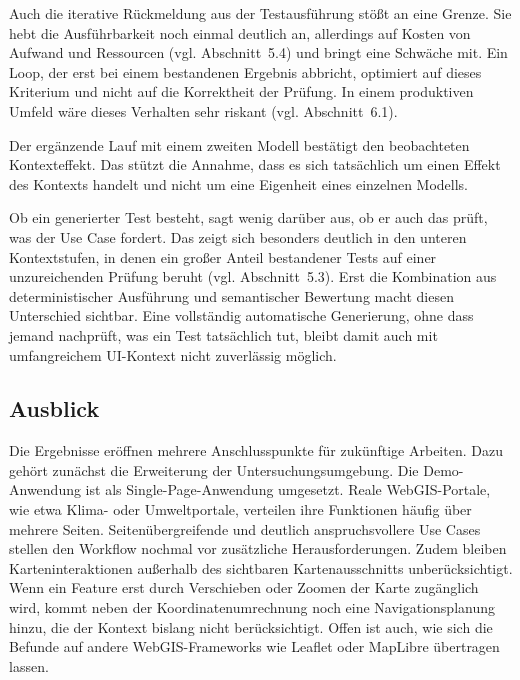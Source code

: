 Auch die iterative Rückmeldung aus der Testausführung stößt an eine Grenze. Sie hebt die Ausführbarkeit noch einmal deutlich an, allerdings auf Kosten von Aufwand und Ressourcen (vgl. Abschnitt~5.4) und bringt eine Schwäche mit. Ein Loop, der erst bei einem bestandenen Ergebnis abbricht, optimiert auf dieses Kriterium und nicht auf die Korrektheit der Prüfung. In einem produktiven Umfeld wäre dieses Verhalten sehr riskant (vgl. Abschnitt~6.1).

Der ergänzende Lauf mit einem zweiten Modell bestätigt den beobachteten Kontexteffekt. Das stützt die Annahme, dass es sich tatsächlich um einen Effekt des Kontexts handelt und nicht um eine Eigenheit eines einzelnen Modells.

Ob ein generierter Test besteht, sagt wenig darüber aus, ob er auch das prüft, was der Use Case fordert. Das zeigt sich besonders deutlich in den unteren Kontextstufen, in denen ein großer Anteil bestandener Tests auf einer unzureichenden Prüfung beruht (vgl. Abschnitt~5.3). Erst die Kombination aus deterministischer Ausführung und semantischer Bewertung macht diesen Unterschied sichtbar. Eine vollständig automatische Generierung, ohne dass jemand nachprüft, was ein Test tatsächlich tut, bleibt damit auch mit umfangreichem \ac{UI}-Kontext nicht zuverlässig möglich.

\subsection{Ausblick}

Die Ergebnisse eröffnen mehrere Anschlusspunkte für zukünftige Arbeiten. Dazu gehört zunächst die Erweiterung der Untersuchungsumgebung. Die Demo-Anwendung ist als Single-Page-Anwendung umgesetzt. Reale WebGIS-Portale, wie etwa Klima- oder Umweltportale, verteilen ihre Funktionen häufig über mehrere Seiten. Seitenübergreifende und deutlich anspruchsvollere Use Cases stellen den Workflow nochmal vor zusätzliche Herausforderungen. Zudem bleiben Karteninteraktionen außerhalb des sichtbaren Kartenausschnitts unberücksichtigt. Wenn ein Feature erst durch Verschieben oder Zoomen der Karte zugänglich wird, kommt neben der Koordinatenumrechnung noch eine Navigationsplanung hinzu, die der Kontext bislang nicht berücksichtigt. Offen ist auch, wie sich die Befunde auf andere WebGIS-Frameworks wie Leaflet oder MapLibre übertragen lassen.

